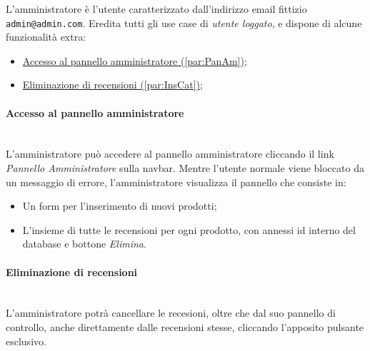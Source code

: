 L'amministratore è l'utente caratterizzato dall'indirizzo email fittizio \texttt{admin@admin.com}. Eredita tutti gli use case di \textit{utente loggato}, e dispone di alcune funzionalità extra:
\begin{itemize}
	\item \hyperref[par:PanAm]{Accesso al pannello amministratore (\ref{par:PanAm})};
	\item \hyperref[par:InsCat]{Eliminazione di recensioni (\ref{par:InsCat})};
\end{itemize}

\paragraph{Accesso al pannello amministratore}\mbox{}\\
\label{par:PanAm}
L'amministratore può accedere al pannello amministratore cliccando il link \textit{Pannello Amministratore} sulla navbar. Mentre l'utente normale viene bloccato da un messaggio di errore, l'amministratore visualizza il pannello che consiste in:
\begin{itemize}
	\item Un form per l'inserimento di nuovi prodotti;
	\item L'insieme di tutte le recensioni per ogni prodotto, con annessi id interno del database e bottone \textit{Elimina}.
\end{itemize}

\paragraph{Eliminazione di recensioni}\mbox{}\\
\label{par:InsCat}
L'amministratore potrà cancellare le recesioni, oltre che dal suo pannello di controllo, anche direttamente
dalle recensioni stesse, cliccando l'apposito pulsante esclusivo.